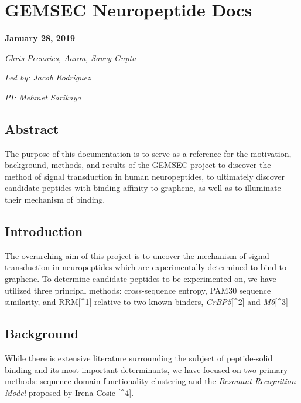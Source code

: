 \documentclass[]{article}
\date{}
\begin{document}
	
	
	
	\hypertarget{gemsec-neuropeptide-docs}{%
		\section{GEMSEC Neuropeptide Docs}\label{gemsec-neuropeptide-docs}}
	
	\textbf{January 28, 2019}
	
	\emph{Chris Pecunies, Aaron, Savvy Gupta}
	
	\emph{Led by: Jacob Rodriguez}
	
	\emph{PI: Mehmet Sarikaya}
	
	\hypertarget{abstract}{%
		\subsection{Abstract}\label{abstract}}
	
	The purpose of this documentation is to serve as a reference for the
	motivation, background, methods, and results of the GEMSEC project to
	discover the method of signal transduction in human neuropeptides, to
	ultimately discover candidate peptides with binding affinity to
	graphene, as well as to illuminate their mechanism of binding.
	
	\hypertarget{introduction}{%
		\subsection{Introduction}\label{introduction}}
	
	The overarching aim of this project is to uncover the mechanism of
	signal transduction in neuropeptides which are experimentally determined
	to bind to graphene. To determine candidate peptides to be experimented
	on, we have utilized three principal methods: cross-sequence entropy,
	PAM30 sequence similarity, and RRM{[}\^{}1{]} relative to two known
	binders, \emph{GrBP5}{[}\^{}2{]} and \emph{M6}{[}\^{}3{]}
	
	\hypertarget{background}{%
		\subsection{Background}\label{background}}
	
	While there is extensive literature surrounding the subject of
	peptide-solid binding and its most important determinants, we have
	focused on two primary methods: sequence domain functionality clustering
	and the \emph{Resonant Recognition Model} proposed by Irena Cosic
	{[}\^{}4{]}.
	
\end{document}
